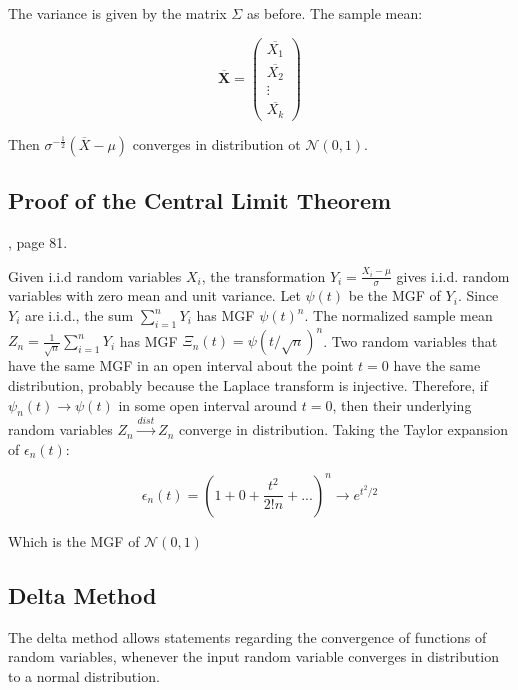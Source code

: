 The variance is given by the matrix $\Sigma$ as before. The sample mean:

\begin{equation}
\overline{\mathbf{X}} = \left(\begin{array}{c}\overline{X_{1}}\\ \overline{X_{2}} \\ \vdots \\ \overline{X_{k}} \end{array}\right)
\end{equation}

Then $\sigma^{-\frac{1}{2}} (\overline{X}-\mu)$ converges in distribution ot $\mathscr{N}(0,1)$.


\subsection{Proof of the Central Limit Theorem}
, page 81.

Given i.i.d random variables $X_i$, the transformation $Y_i = \frac{X_i-\mu}{\sigma}$ gives i.i.d. random variables with zero mean and unit variance. Let $\psi(t)$ be the MGF of $Y_i$. Since $Y_i$ are i.i.d., the sum $\sum_{i=1}^n Y_i$ has MGF $\psi(t)^n$. The normalized sample mean $Z_n = \frac{1}{\sqrt{n}}\sum_{i=1}^n Y_i$ has MGF $\Xi_n(t)=\psi(t/\sqrt{n})^n$. Two random variables that have the same MGF in an open interval about the point $t=0$ have the same distribution, probably because the Laplace transform is injective. Therefore, if $\psi_n(t)\rightarrow \psi(t)$ in some open interval around $t=0$, then their underlying random variables $Z_n \xrightarrow{dist}Z_n$ converge in distribution. Taking the Taylor expansion of $\epsilon_n(t)$:

\begin{equation}
\epsilon_n(t) = \left(1+0+\frac{t^2}{2! n} + ... \right)^n \rightarrow e^{t^2/2}
\end{equation}

Which is the MGF of $\mathscr{N}(0,1)$

\subsection{Delta Method}

The delta method allows statements regarding the convergence of functions of random variables, whenever the input random variable converges in distribution to a normal distribution. 

